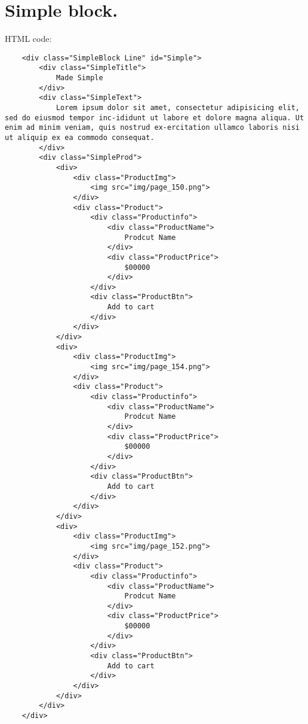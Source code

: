 \section{Simple block.}
HTML code:
\begin{verbatim}
    <div class="SimpleBlock Line" id="Simple">
        <div class="SimpleTitle">
            Made Simple
        </div>
        <div class="SimpleText">
            Lorem ipsum dolor sit amet, consectetur adipisicing elit, sed do eiusmod tempor inc-ididunt ut labore et dolore magna aliqua. Ut enim ad minim veniam, quis nostrud ex-ercitation ullamco laboris nisi ut aliquip ex ea commodo consequat.
        </div>
        <div class="SimpleProd">
            <div>
                <div class="ProductImg">
                    <img src="img/page_150.png">
                </div>
                <div class="Product">
                    <div class="Productinfo">
                        <div class="ProductName">
                            Prodcut Name
                        </div>
                        <div class="ProductPrice">
                            $00000
                        </div>
                    </div>
                    <div class="ProductBtn">
                        Add to cart
                    </div>
                </div>
            </div>
            <div>
                <div class="ProductImg">
                    <img src="img/page_154.png">
                </div>
                <div class="Product">
                    <div class="Productinfo">
                        <div class="ProductName">
                            Prodcut Name
                        </div>
                        <div class="ProductPrice">
                            $00000
                        </div>
                    </div>
                    <div class="ProductBtn">
                        Add to cart
                    </div>
                </div>
            </div>
            <div>
                <div class="ProductImg">
                    <img src="img/page_152.png">
                </div>
                <div class="Product">
                    <div class="Productinfo">
                        <div class="ProductName">
                            Prodcut Name
                        </div>
                        <div class="ProductPrice">
                            $00000
                        </div>
                    </div>
                    <div class="ProductBtn">
                        Add to cart
                    </div>
                </div>
            </div>
        </div>
    </div>
\end{verbatim}
